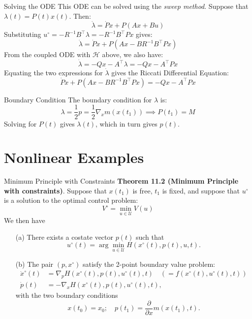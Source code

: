 \documentclass[10pt]{beamer}
\begin{document}
\begin{frame}[fragile]{Solving the ODE}
  This ODE can be solved using the \textit{sweep method}. Suppose that \( \lambda(t) = P(t)x(t) \). Then:
  \[
  \dot{\lambda} = \dot{P} x + P (Ax + Bu)
  \]
  Substituting \( u^\circ = -R^{-1} B^{\top} \lambda = -R^{-1} B^{\top} P x \) gives:
  \[
  \dot{\lambda} = \dot{P} x + P (Ax - BR^{-1} B^{\top} P x)
  \]
  From the coupled ODE with \(\mathcal{H}\) above, we also have:
  \[
  \dot{\lambda} = -Qx - A^{\top} \lambda = -Qx - A^{\top} P x
  \]
  Equating the two expressions for \( \dot{\lambda} \) gives the Riccati Differential Equation:
  \[
  \dot{P} x + P (Ax - BR^{-1} B^{\top} P x) = -Qx - A^{\top} P x
  \]
\end{frame}

\begin{frame}[fragile]{Boundary Condition}
  The boundary condition for \( \lambda \) is:
  \[
  \lambda = \frac{1}{2} p = \frac{1}{2} \nabla_x m(x(t_1)) \implies P(t_1) = M
  \]
  Solving for \( P(t) \) gives \( \lambda(t) \), which in turn gives \( p(t) \).
\end{frame}

\section{Nonlinear Examples}

\begin{frame}[fragile]{Minimum Principle with Constraints}
  \textbf{Theorem 11.2 (Minimum Principle with constraints)}. Suppose that \( x(t_1) \) is free, \( t_1 \) is fixed, and suppose that \( u^\circ \) is a solution to the optimal control problem: 
  \[
    V^\circ = \min_{u \in \mathcal{U}} V(u)
  \]
  We then have
  \begin{itemize}
      \item[(a)] There exists a costate vector \( p(t) \) such that
      \[
        u^\circ (t) = \arg \min_{u \in \mathcal{U}} H(x^\circ (t), p(t), u, t).
      \]
  
      \item[(b)] The pair \( (p, x^\circ) \) satisfy the 2-point boundary value problem:
      \begin{align*}
        \dot{x}^\circ(t) &= \nabla_p H(x^\circ(t), p(t), u^\circ(t), t) \quad \left( = f(x^\circ(t), u^\circ(t), t) \right) \\
        \dot{p}(t) &= -\nabla_x H(x^\circ(t), p(t), u^\circ(t), t),
      \end{align*}
      with the two boundary conditions
      \[
        x(t_0) = x_0; \quad p(t_1) = \frac{\partial}{\partial x} m(x(t_1), t).
      \]
  \end{itemize}
\end{frame}
  
\end{document}
